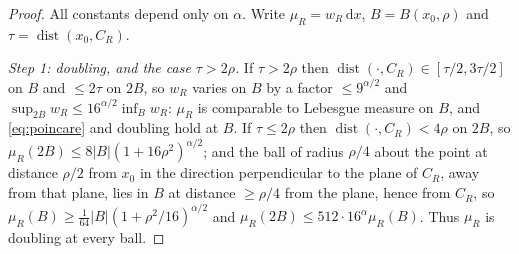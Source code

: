\documentclass[11pt]{amsart}
\newcommand{\dd}{\,\mathrm{d}}
\newcommand{\abs}[1]{\lvert #1\rvert}
\DeclareMathOperator{\dist}{dist}
\theoremstyle{plain}
\theoremstyle{definition}
\theoremstyle{remark}
\begin{document}
\begin{proof}
All constants depend only on $\alpha$. Write $\mu_R=w_R\dd x$,
$B=B(x_0,\rho)$ and $\tau=\dist(x_0,C_R)$.

\emph{Step 1: doubling, and the case $\tau>2\rho$.} If $\tau>2\rho$ then
$\dist(\cdot,C_R)\in[\tau/2,3\tau/2]$ on $B$ and $\le2\tau$ on $2B$, so $w_R$
varies on $B$ by a factor $\le9^{\alpha/2}$ and
$\sup_{2B}w_R\le16^{\alpha/2}\inf_Bw_R$: $\mu_R$ is comparable to Lebesgue
measure on $B$, and \eqref{eq:poincare} and doubling hold at $B$. If
$\tau\le2\rho$ then $\dist(\cdot,C_R)<4\rho$ on $2B$, so
$\mu_R(2B)\le8\abs B(1+16\rho^2)^{\alpha/2}$; and the ball of radius $\rho/4$
about the point at distance $\rho/2$ from $x_0$ in the direction perpendicular
to the plane of $C_R$, away from that plane, lies in $B$ at distance
$\ge\rho/4$ from the plane, hence from $C_R$, so
$\mu_R(B)\ge\tfrac1{64}\abs B(1+\rho^2/16)^{\alpha/2}$ and
$\mu_R(2B)\le512\cdot16^\alpha\mu_R(B)$. Thus $\mu_R$ is doubling at every
ball.


\end{proof}
\end{document}
